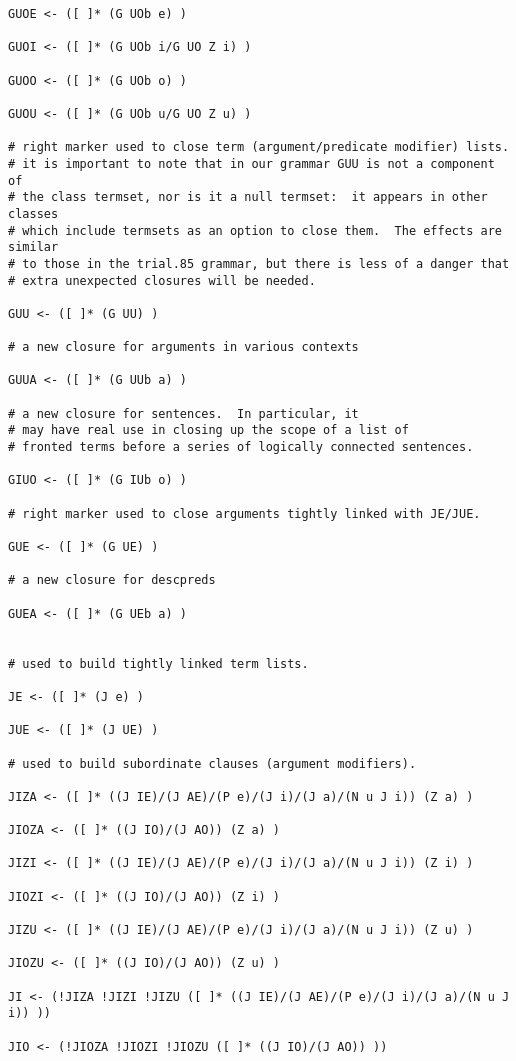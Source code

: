 \documentclass[12pt]{book}
\begin{document}
{\begin{verbatim}
GUOE <- ([ ]* (G UOb e) )

GUOI <- ([ ]* (G UOb i/G UO Z i) )

GUOO <- ([ ]* (G UOb o) )

GUOU <- ([ ]* (G UOb u/G UO Z u) )

# right marker used to close term (argument/predicate modifier) lists.
# it is important to note that in our grammar GUU is not a component of
# the class termset, nor is it a null termset:  it appears in other classes
# which include termsets as an option to close them.  The effects are similar
# to those in the trial.85 grammar, but there is less of a danger that
# extra unexpected closures will be needed.

GUU <- ([ ]* (G UU) )

# a new closure for arguments in various contexts

GUUA <- ([ ]* (G UUb a) )

# a new closure for sentences.  In particular, it
# may have real use in closing up the scope of a list of
# fronted terms before a series of logically connected sentences.

GIUO <- ([ ]* (G IUb o) )

# right marker used to close arguments tightly linked with JE/JUE.

GUE <- ([ ]* (G UE) )

# a new closure for descpreds

GUEA <- ([ ]* (G UEb a) )


# used to build tightly linked term lists.

JE <- ([ ]* (J e) )

JUE <- ([ ]* (J UE) )

# used to build subordinate clauses (argument modifiers).

JIZA <- ([ ]* ((J IE)/(J AE)/(P e)/(J i)/(J a)/(N u J i)) (Z a) )

JIOZA <- ([ ]* ((J IO)/(J AO)) (Z a) )

JIZI <- ([ ]* ((J IE)/(J AE)/(P e)/(J i)/(J a)/(N u J i)) (Z i) )

JIOZI <- ([ ]* ((J IO)/(J AO)) (Z i) )

JIZU <- ([ ]* ((J IE)/(J AE)/(P e)/(J i)/(J a)/(N u J i)) (Z u) )

JIOZU <- ([ ]* ((J IO)/(J AO)) (Z u) )

JI <- (!JIZA !JIZI !JIZU ([ ]* ((J IE)/(J AE)/(P e)/(J i)/(J a)/(N u J i)) ))

JIO <- (!JIOZA !JIOZI !JIOZU ([ ]* ((J IO)/(J AO)) ))


\end{verbatim}}
\end{document}
